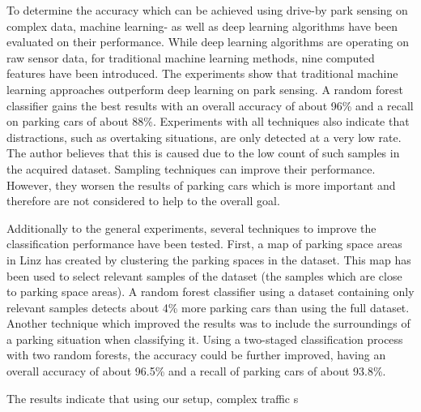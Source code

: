
To determine the accuracy which can be achieved using drive-by park sensing on complex data, machine learning- as well as deep learning algorithms have been evaluated on their performance. While deep learning algorithms are operating on raw sensor data, for traditional machine learning methods, nine computed features have been introduced. The experiments show that traditional machine learning approaches outperform deep learning on park sensing. A random forest classifier gains the best results with an overall accuracy of about 96\% and a recall on parking cars of about 88\%. Experiments with all techniques also indicate that distractions, such as overtaking situations, are only detected at a very low rate. The author believes that this is caused due to the low count of such samples in the acquired dataset. Sampling techniques can improve their performance. However, they worsen the results of parking cars which is more important and therefore are not considered to help to the overall goal.

Additionally to the general experiments, several techniques to improve the classification performance have been tested. First, a map of parking space areas in Linz has created by clustering the parking spaces in the dataset. This map has been used to select relevant samples of the dataset (the samples which are close to parking space areas). A random forest classifier using a dataset containing only relevant samples detects about 4\% more parking cars than using the full dataset. Another technique which improved the results was to include the surroundings of a parking situation when classifying it. Using a two-staged classification process with two random forests, the accuracy could be further improved, having an overall accuracy of about 96.5\% and a recall of parking cars of about 93.8\%.

The results indicate that using our setup, complex traffic s










